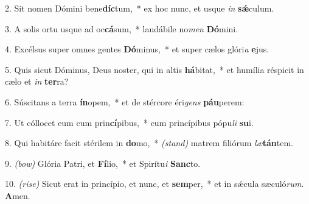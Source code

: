 2. Sit nomen Dómini bene\textbf{díc}tum,~* ex hoc nunc, et usque \textit{in} \textbf{sǽ}culum.

3. A solis ortu usque ad oc\textbf{cá}sum,~* laudábile no\textit{men} \textbf{Dó}mini.

4. Excélsus super omnes gentes \textbf{Dó}minus,~* et super cælos glóri\textit{a} \textbf{e}jus.

5. Quis sicut Dóminus, Deus noster, qui in altis \textbf{há}bitat,~* et humília réspicit in cælo et \textit{in} \textbf{ter}ra?

6. Súscitans a terra \textbf{ín}opem,~* et de stércore éri\textit{gens} \textbf{páu}perem:

7. Ut cóllocet eum cum prin\textbf{cí}pibus,~* cum princípibus pópu\textit{li} \textbf{su}i.

8. Qui habitáre facit stérilem in \textbf{do}mo,~* {\color{red}\textit{(stand)}} matrem filiórum \textit{læ}\textbf{tán}tem.

9. {\color{red}\textit{(bow)}} Glória Patri, et \textbf{Fí}lio,~* et Spirítu\textit{i} \textbf{Sanc}to.

10. {\color{red}\textit{(rise)}} Sicut erat in princípio, et nunc, et \textbf{sem}per,~* et in sǽcula sæculó\textit{rum}. \textbf{A}men.